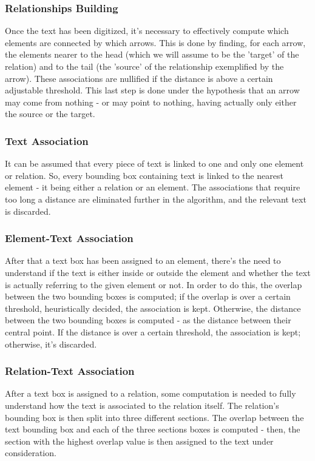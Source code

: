 \documentclass[conference]{IEEEtran}
\begin{document}
\subsubsection{Relationships Building}
Once the text has been digitized, it's necessary to effectively compute which elements are connected by which arrows. This is done by finding, for each arrow, the elements nearer to the head (which we will assume to be the 'target' of the relation) and to the tail (the 'source' of the relationship exemplified by the arrow). These associations are nullified if the distance is above a certain adjustable threshold. This last step is done under the hypothesis that an arrow may come from nothing - or may point to nothing, having actually only either the source or the target. \\

\subsubsection{Text Association}
It can be assumed that every piece of text is linked to one and only one element or relation. So, every bounding box containing text is linked to the nearest element - it being either a relation or an element. The associations that require too long a distance are eliminated further in the algorithm, and the relevant text is discarded.\\

\subsubsection{Element-Text Association}
After that a text box has been assigned to an element, there's the need to understand if the text is either inside or outside the element and whether the text is actually referring to the given element or not. In order to do this, the overlap between the two bounding boxes is computed; if the overlap is over a certain threshold, heuristically decided, the association is kept. Otherwise, the distance between the two bounding boxes is computed - as the distance between their central point. If the distance is over a certain threshold, the association is kept; otherwise, it's discarded.\\

\subsubsection{Relation-Text Association}
After a text box is assigned to a relation, some computation is needed to fully understand how the text is associated to the relation itself. The relation's bounding box is then split into three different sections. The overlap between the text bounding box and each of the three sections boxes is computed - then, the section with the highest overlap value is then assigned to the text under consideration. 
\end{document}
